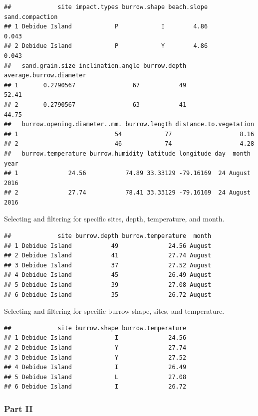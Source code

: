 \documentclass[
]{article}
\begin{document}
\begin{verbatim}
##             site impact.types burrow.shape beach.slope sand.compaction
## 1 Debidue Island            P            I        4.86           0.043
## 2 Debidue Island            P            Y        4.86           0.043
##   sand.grain.size inclination.angle burrow.depth average.burrow.diameter
## 1       0.2790567                67           49                   52.41
## 2       0.2790567                63           41                   44.75
##   burrow.opening.diameter..mm. burrow.length distance.to.vegetation
## 1                           54            77                   8.16
## 2                           46            74                   4.28
##   burrow.temperature burrow.humidity latitude longitude day  month year
## 1              24.56           74.89 33.33129 -79.16169  24 August 2016
## 2              27.74           78.41 33.33129 -79.16169  24 August 2016
\end{verbatim}

Selecting and filtering for specific sites, depth, temperature, and
month.

\begin{verbatim}
##             site burrow.depth burrow.temperature  month
## 1 Debidue Island           49              24.56 August
## 2 Debidue Island           41              27.74 August
## 3 Debidue Island           37              27.52 August
## 4 Debidue Island           45              26.49 August
## 5 Debidue Island           39              27.08 August
## 6 Debidue Island           35              26.72 August
\end{verbatim}

Selecting and filtering for specific burrow shape, sites, and
temperature.

\begin{verbatim}
##             site burrow.shape burrow.temperature
## 1 Debidue Island            I              24.56
## 2 Debidue Island            Y              27.74
## 3 Debidue Island            Y              27.52
## 4 Debidue Island            I              26.49
## 5 Debidue Island            L              27.08
## 6 Debidue Island            I              26.72
\end{verbatim}

\hypertarget{part-ii}{%
\subsubsection{Part II}\label{part-ii}}
\end{document}
